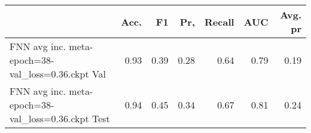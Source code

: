\begin{tabular}{lrrrrrr}
\toprule
{} &  Acc. &    F1 &   Pr, &  Recall &   AUC &  Avg. pr \\
\midrule
FNN avg inc. meta-epoch=38-val\_loss=0.36.ckpt Val  &  0.93 &  0.39 &  0.28 &    0.64 &  0.79 &     0.19 \\
FNN avg inc. meta-epoch=38-val\_loss=0.36.ckpt Test &  0.94 &  0.45 &  0.34 &    0.67 &  0.81 &     0.24 \\
\bottomrule
\end{tabular}
